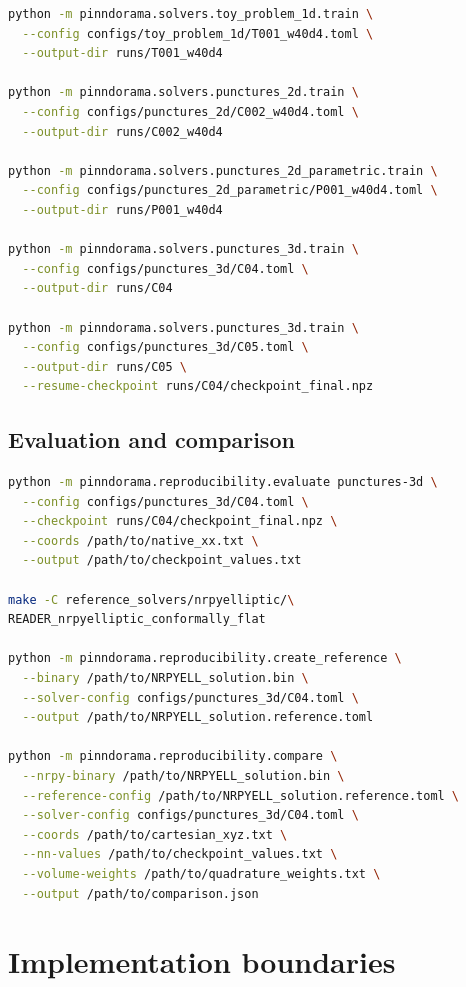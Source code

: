 \documentclass[11pt]{article}
\begin{document}
\begin{lstlisting}[language=bash]
python -m pinndorama.solvers.toy_problem_1d.train \
  --config configs/toy_problem_1d/T001_w40d4.toml \
  --output-dir runs/T001_w40d4

python -m pinndorama.solvers.punctures_2d.train \
  --config configs/punctures_2d/C002_w40d4.toml \
  --output-dir runs/C002_w40d4

python -m pinndorama.solvers.punctures_2d_parametric.train \
  --config configs/punctures_2d_parametric/P001_w40d4.toml \
  --output-dir runs/P001_w40d4

python -m pinndorama.solvers.punctures_3d.train \
  --config configs/punctures_3d/C04.toml \
  --output-dir runs/C04

python -m pinndorama.solvers.punctures_3d.train \
  --config configs/punctures_3d/C05.toml \
  --output-dir runs/C05 \
  --resume-checkpoint runs/C04/checkpoint_final.npz
\end{lstlisting}

\subsection*{Evaluation and comparison}

\begin{lstlisting}[language=bash]
python -m pinndorama.reproducibility.evaluate punctures-3d \
  --config configs/punctures_3d/C04.toml \
  --checkpoint runs/C04/checkpoint_final.npz \
  --coords /path/to/native_xx.txt \
  --output /path/to/checkpoint_values.txt

make -C reference_solvers/nrpyelliptic/\
READER_nrpyelliptic_conformally_flat

python -m pinndorama.reproducibility.create_reference \
  --binary /path/to/NRPYELL_solution.bin \
  --solver-config configs/punctures_3d/C04.toml \
  --output /path/to/NRPYELL_solution.reference.toml

python -m pinndorama.reproducibility.compare \
  --nrpy-binary /path/to/NRPYELL_solution.bin \
  --reference-config /path/to/NRPYELL_solution.reference.toml \
  --solver-config configs/punctures_3d/C04.toml \
  --coords /path/to/cartesian_xyz.txt \
  --nn-values /path/to/checkpoint_values.txt \
  --volume-weights /path/to/quadrature_weights.txt \
  --output /path/to/comparison.json
\end{lstlisting}

\section{Implementation boundaries}
\end{document}
